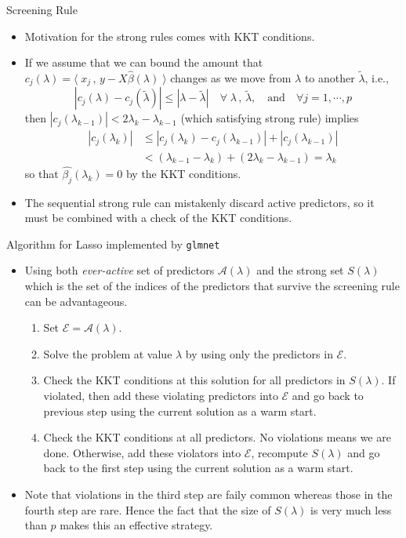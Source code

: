 \documentclass[blue, 10pt]{beamer}
\begin{document}
\begin{frame}{Screening Rule}

  \begin{itemize}
    \item Motivation for the strong rules comes with KKT conditions. 
    \item If we assume that we can bound the amount that $c_j(\lambda) = \langle\; x_j \,,\,y-X\hat\beta(\lambda)\;\rangle$ changes as we move from $\lambda$ to another $\tilde\lambda$, i.e., $$|c_j(\lambda)-c_j(\tilde\lambda)|\leq |\lambda-\tilde\lambda| \quad \forall \; \lambda\, ,\, \tilde\lambda, \quad\text{and}\quad \forall j = 1, \cdots, p $$
    then $|c_j(\lambda_{k-1})|<2\lambda_k-\lambda_{k-1}$ (which satisfying strong rule) implies
    \begin{align*}
      |c_j(\lambda_k)|&\leq |c_j(\lambda_k)-c_j(\lambda_{k-1})|+|c_j(\lambda_{k-1})|\\
      &< (\lambda_{k-1}-\lambda_k) + (2\lambda_k - \lambda_{k-1}) = \lambda_k 
    \end{align*}  
    so that $\hat{\beta_j}(\lambda_k)=0$ by the KKT conditions.
    \item The sequential strong rule can mistakenly discard active predictors, so it must be combined with a check of the KKT conditions.
  \end{itemize}

\end{frame}


\begin{frame}{Algorithm for Lasso implemented by \texttt{glmnet}}

  \begin{itemize}
    \item Using both \textit{ever-active} set of predictors $\mathcal{A}(\lambda)$ and the strong set $S(\lambda)$ which is the set of the indices of the predictors that survive the screening rule can be advantageous.
    \begin{enumerate}
      \item Set $\mathcal{E} = \mathcal{A}(\lambda)$.
      \item Solve the problem at value $\lambda$ by using only the predictors in $\mathcal{E}$.
      \item Check the KKT conditions at this solution for all predictors in $S(\lambda)$. If violated, then add these violating predictors into $\mathcal{E}$ and go back to previous step using the current solution as a warm start.
      \item Check the KKT conditions at all predictors. No violations means we are done. Otherwise, add these violators into $\mathcal{E}$, recompute $S(\lambda)$ and go back to the first step using the current solution as a warm start. 
    \end{enumerate}
    \item Note that violations in the third step are faily common whereas those in the fourth step are rare. Hence the fact that the size of $S(\lambda)$ is very much less than $p$ makes this an effective strategy.
  \end{itemize}

\end{frame}
\end{document}
